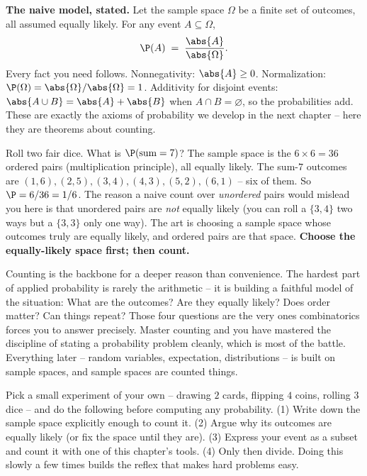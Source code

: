 \begin{formalbox}
\textbf{The naive model, stated.} Let the sample space $\Omega$ be a finite set of outcomes,
all assumed equally likely. For any event $A \subseteq \Omega$,
\[
  \P(A) \;=\; \frac{\abs{A}}{\abs{\Omega}}.
\]
Every fact you need follows. Nonnegativity: $\abs{A} \ge 0$. Normalization:
$\P(\Omega) = \abs{\Omega}/\abs{\Omega} = 1$. Additivity for disjoint events:
$\abs{A \cup B} = \abs{A} + \abs{B}$ when $A \cap B = \varnothing$, so the probabilities
add. These are exactly the axioms of probability we develop in the next chapter -- here
they are theorems about counting.
\end{formalbox}

\begin{example}
\label{ch2:ex-twodice}
Roll two fair dice. What is $\P(\text{sum} = 7)$? The sample space is the $6 \times 6 = 36$
ordered pairs (multiplication principle), all equally likely. The sum-$7$ outcomes are
$(1,6),(2,5),(3,4),(4,3),(5,2),(6,1)$ -- six of them. So $\P = 6/36 = 1/6$. The reason a
naive count over \emph{unordered} pairs would mislead you here is that unordered pairs are
\emph{not} equally likely (you can roll a $\{3,4\}$ two ways but a $\{3,3\}$ only one way).
The art is choosing a sample space whose outcomes truly are equally likely, and ordered
pairs are that space. \textbf{Choose the equally-likely space first; then count.}
\end{example}

\begin{aestheticbox}
Counting is the backbone for a deeper reason than convenience. The hardest part of applied
probability is rarely the arithmetic -- it is building a faithful model of the situation:
What are the outcomes? Are they equally likely? Does order matter? Can things repeat? Those
four questions are the very ones combinatorics forces you to answer precisely. Master
counting and you have mastered the discipline of stating a probability problem cleanly,
which is most of the battle. Everything later -- random variables, expectation,
distributions -- is built on sample spaces, and sample spaces are counted things.
\end{aestheticbox}

\begin{labbox}
Pick a small experiment of your own -- drawing $2$ cards, flipping $4$ coins, rolling $3$
dice -- and do the following before computing any probability. (1) Write down the sample
space explicitly enough to count it. (2) Argue why its outcomes are equally likely (or fix
the space until they are). (3) Express your event as a subset and count it with one of this
chapter's tools. (4) Only then divide. Doing this slowly a few times builds the reflex that
makes hard problems easy.
\end{labbox}

